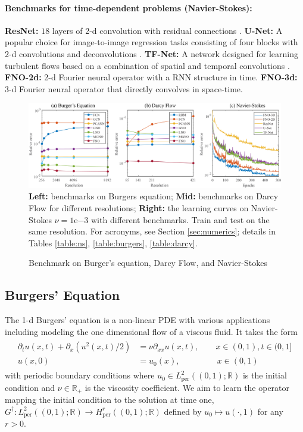 \documentclass{article} %
\newcommand{\R}{\mathbb{R}}
\newcommand{\Ftrue}{G^\dagger}
\begin{document}
\paragraph{Benchmarks for time-dependent problems (Navier-Stokes):}
{\bf ResNet:} $18$ layers of 2-d convolution with residual connections \citep{he2016deep}.
{\bf U-Net:} A popular choice for image-to-image regression tasks consisting of four blocks with 2-d convolutions and deconvolutions \citep{ronneberger2015u}.
{\bf TF-Net:} A network designed for learning turbulent flows based on a combination of spatial and temporal convolutions \citep{wang2020towards}. 
{\bf FNO-2d:} 2-d Fourier neural operator with a RNN structure in time.
{\bf FNO-3d:} 3-d Fourier neural operator that directly convolves in space-time.


\begin{figure}
    \centering
    \includegraphics[width=\textwidth]{figs/FourierNN_error.png}
    {\small \textbf{Left:} benchmarks on Burgers equation;  \textbf{Mid:} benchmarks on Darcy Flow for different resolutions; \textbf{Right:} the learning curves on Navier-Stokes $\nu=1\mathrm{e}{-3}$ with different benchmarks. Train and test on the same resolution.
    For acronyms, see Section \ref{sec:numerics}; details in Tables \ref{table:ns}, \ref{table:burgers}, \ref{table:darcy}.} 
    \caption{Benchmark on Burger's equation, Darcy Flow, and Navier-Stokes}
    \label{fig:error}
\end{figure}


\subsection{Burgers' Equation}
\label{ssec:burgers}
The 1-d Burgers' equation is a non-linear PDE with various applications including modeling the one dimensional flow of a viscous fluid. It takes the form
\begin{align}
    \begin{split}
    \partial_t u(x,t) + \partial_x ( u^2(x,t)/2) &= \nu \partial_{xx} u(x,t), \qquad x \in (0,1), t \in (0,1] \\
    u(x,0) &= u_0(x), \qquad \qquad \:\: x \in (0,1)
    \end{split}
\end{align}
with periodic boundary conditions where $u_0 \in L^2_{\text{per}}((0,1);\R)$ is the initial condition and $\nu \in \R_+$ is the viscosity coefficient. We aim to learn the operator mapping the initial condition to the solution at time one, $\Ftrue: L^2_{\text{per}}((0,1);\R) \to H^r_{\text{per}} ((0,1);\R)$ defined by $u_0 \mapsto u(\cdot, 1)$ for any $r > 0$.
\end{document}
